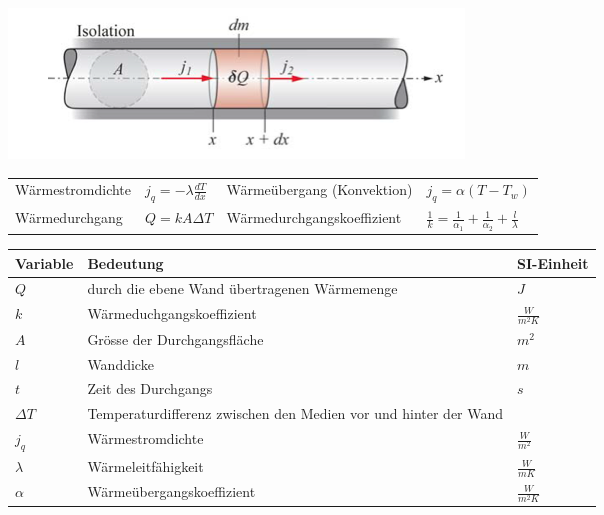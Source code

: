 \documentclass[
a4paper,
oneside,
landscape, 
8pt,
]{scrartcl}
\begin{document}
\begin{multicols*}{2}
\begin{minipage}[h!]{0.5\linewidth}
\includegraphics[width=\linewidth]{images/waermestromdichte}
\end{minipage}
\hfill
\begin{minipage}[h!]{0.5\linewidth}

\end{minipage}

\begin{tabbing}
	\begin{tabu} to \linewidth {l X l X}
		\toprule
		Wärmestromdichte & $j_q=- \lambda \frac{dT}{dx}$ &
		Wärmeübergang (Konvektion) & $j_q=\alpha (T-T_w)$ \\
		Wärmedurchgang & $Q = k A \Delta T$ &
		Wärmedurchgangskoeffizient & $ \frac{1}{k} = \frac{1}{\alpha_1} + \frac{1}{\alpha_2} + \frac{l}{\lambda} $ \\
	\end{tabu}
\end{tabbing}

\begin{tabbing}
	\begin{tabu} to \linewidth {l X l}
		Variable & Bedeutung & SI-Einheit \\
		\midrule
		$Q$ & durch die ebene Wand übertragenen Wärmemenge & $J$ \\
		$k$ & Wärmeduchgangskoeffizient & $\frac{W}{m^2K}$\\
		$A$ & Grösse der Durchgangsfläche & $m^2$\\
		$l$ & Wanddicke & $m$ \\
		$t$ & Zeit des Durchgangs & $s$ \\
		$\Delta T$ & Temperaturdifferenz zwischen den Medien vor und hinter der Wand & \\
		$j_q$ & Wärmestromdichte & $\frac{W}{m^2}$ \\
		$\lambda$ & Wärmeleitfähigkeit & $\frac{W}{mK}$ \\
		$\alpha$ & Wärmeübergangskoeffizient & $\frac{W}{m^2K}$ \\
		\bottomrule
	\end{tabu}
\end{tabbing}


\end{multicols*}
\end{document}
